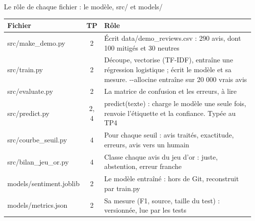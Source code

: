 \documentclass[aspectratio=169,11pt]{beamer}
\newcommand{\co}[1]{{\ttfamily\hyphenchar\font=45\relax #1}}
\begin{document}
\begin{frame}{Le rôle de chaque fichier : le modèle, src/ et models/}
\scriptsize
\begin{tabularx}{\textwidth}{@{}l c X@{}}
\toprule
\textbf{Fichier} & \textbf{TP} & \textbf{Rôle} \\
\midrule
\co{src/make\_demo.py} & 2 & Écrit \co{data/demo\_reviews.csv} : 290 avis, dont 100 mitigés et 30 neutres \\
\co{src/train.py} & 2 & Découpe, vectorise (TF-IDF), entraîne une régression logistique ; écrit le modèle et sa mesure.
\co{-{}-allocine} entraîne sur 20 000 vrais avis \\
\co{src/evaluate.py} & 2 & La matrice de confusion et les erreurs, à lire \\
\co{src/predict.py} & 2, 4 & \co{predict(texte)} : charge le modèle une seule fois, renvoie l'étiquette et la confiance. Typée au TP4 \\
\co{src/courbe\_seuil.py} & 4 & Pour chaque seuil : avis traités, exactitude, erreurs, avis vers un humain \\
\co{src/bilan\_jeu\_or.py} & 4 & Classe chaque avis du jeu d'or : juste, abstention, erreur franche \\
\midrule
\co{models/sentiment.joblib} & 2 & Le modèle entraîné : hors de Git, reconstruit par \co{train.py} \\
\co{models/metrics.json} & 2 & Sa mesure (F1, source, taille du test) : versionnée, lue par les tests \\
\bottomrule
\end{tabularx}
\end{frame}
\end{document}
